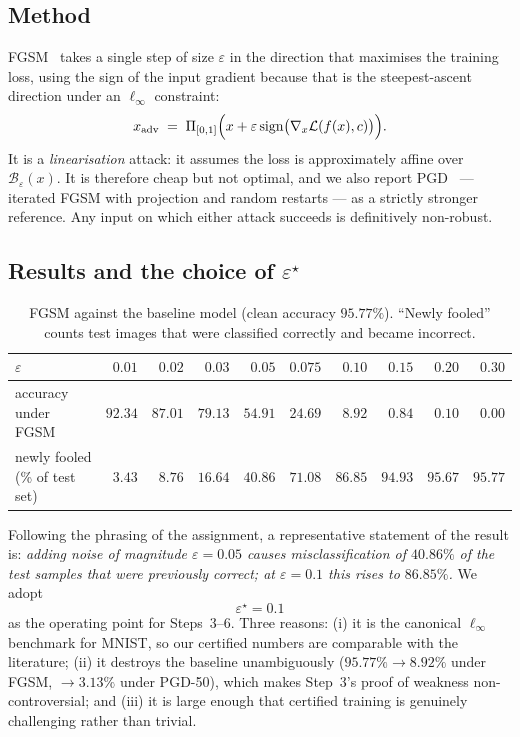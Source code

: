 \documentclass[11pt,a4paper]{article}
\newcommand{\eps}{\varepsilon}
\newcommand{\B}{\mathcal{B}}
\begin{document}
\subsection{Method}
FGSM~\cite{goodfellow2015} takes a single step of size $\eps$ in the direction
that maximises the training loss, using the sign of the input gradient because
that is the steepest-ascent direction under an $\ell_\infty$ constraint:
\begin{equation}
x_{\mathrm{adv}} \;=\; \Pi_{[0,1]}\Bigl(x + \eps\,\mathrm{sign}\bigl(\nabla_x \mathcal{L}(f(x),c)\bigr)\Bigr).
\label{eq:fgsm}
\end{equation}
It is a \emph{linearisation} attack: it assumes the loss is approximately
affine over $\B_\eps(x)$. It is therefore cheap but not optimal, and we also
report PGD~\cite{madry2018} --- iterated FGSM with projection and random
restarts --- as a strictly stronger reference. Any input on which either attack
succeeds is definitively non-robust.

\subsection{Results and the choice of $\eps^\star$}

\begin{table}[H]
\centering\small
\begin{tabular}{lrrrrrrrrr}
\toprule
$\eps$ & $0.01$ & $0.02$ & $0.03$ & $0.05$ & $0.075$ & $\mathbf{0.10}$ & $0.15$ & $0.20$ & $0.30$\\
\midrule
accuracy under FGSM & $92.34$ & $87.01$ & $79.13$ & $54.91$ & $24.69$ & $\mathbf{8.92}$ & $0.84$ & $0.10$ & $0.00$\\
newly fooled (\% of test set) & $3.43$ & $8.76$ & $16.64$ & $40.86$ & $71.08$ & $\mathbf{86.85}$ & $94.93$ & $95.67$ & $95.77$\\
\bottomrule
\end{tabular}
\caption{FGSM against the baseline model (clean accuracy $95.77\%$). ``Newly
fooled'' counts test images that were classified correctly and became incorrect.}
\label{tab:fgsm}
\end{table}

Following the phrasing of the assignment, a representative statement of the
result is: \emph{adding noise of magnitude $\eps=0.05$ causes misclassification
of $40.86\%$ of the test samples that were previously correct; at
$\eps=0.1$ this rises to $86.85\%$.} We adopt
\[
\boxed{\eps^\star = 0.1}
\]
as the operating point for Steps~3--6. Three reasons: (i) it is the canonical
$\ell_\infty$ benchmark for MNIST, so our certified numbers are comparable with
the literature; (ii) it destroys the baseline unambiguously ($95.77\%\to8.92\%$
under FGSM, $\to3.13\%$ under PGD-50), which makes Step~3's proof of weakness
non-controversial; and (iii) it is large enough that certified training is
genuinely challenging rather than trivial.
\end{document}
